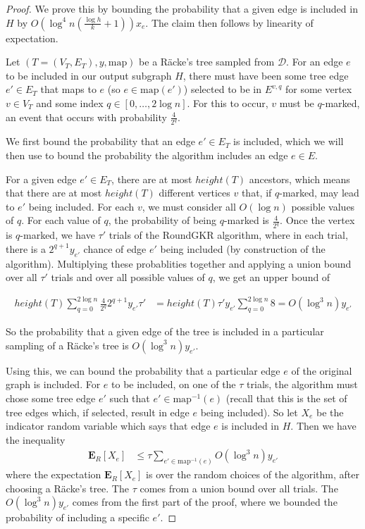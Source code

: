 \documentclass[12pt]{article}
\begin{document}
\begin{proof}
We prove this by bounding the probability that a given edge is included in $H$ by $O(\log^4n(\frac{\log h}{k} + 1))x_e$. The claim then follows by linearity of expectation.

Let $(T = (V_T, E_T), y, \text{map})$ be a R\"{a}cke's tree sampled from $\mathcal{D}$. For an edge $e$ to be included in our output subgraph $H$, there must have been some tree edge $e' \in E_T$ that maps to $e$ (so $e \in \mathrm{map}(e')$) selected to be in $E^{v,q}$ for some vertex $v \in V_T$ and some index $q \in [0,\dots,2\log n]$. For this to occur, $v$ must be $q$-marked, an event that occurs with probability $\frac{4}{2^{q}}$. 

We first bound the probability that an edge $e' \in E_T$ is included, which we will then use to bound the probability the algorithm includes an edge $e \in E$.

For a given edge $e' \in E_T$, there are at most $height(T)$ ancestors, which means that there are at most $height(T)$ different vertices $v$ that, if $q$-marked, may lead to $e'$ being included. For each $v$, we must consider all $O(\log n)$ possible values of $q$. For each value of $q$, the probability of being $q$-marked is $\frac{4}{2^{q}}$. Once the vertex is $q$-marked, we have $\tau'$ trials of the RoundGKR algorithm, where in each trial, there is a $2^{q+1}y_{e'}$ chance of edge $e'$ being included (by construction of the algorithm). Multiplying these probablities together and applying a union bound over all $\tau'$ trials and over all possible values of $q$, we get an upper bound of 

\begin{align}
height(T) \sum_{q=0}^{2\log n} \frac{4}{2^{q}} 2^{q+1} y_{e'} \tau' &= height(T) \tau' y_{e'} \sum_{q=0}^{2\log n} 8 = O(\log^3 n) y_{e'} 
\end{align}

So the probability that a given edge of the tree is included in a particular sampling of a R\"{a}cke's tree is $O(\log^3 n) y_{e'}$. 

Using this, we can bound the probability that a particular edge $e$ of the original graph is included. For $e$ to be included, on one of the $\tau$ trials, the algorithm must chose some tree edge $e'$ such that $e' \in \mathrm{map}^{-1}(e)$ (recall that this is the set of tree edges which, if selected, result in edge $e$ being included). So let $X_e$ be the indicator random variable which says that edge $e$ is included in $H$. Then we have the inequality
\begin{align}
 \textbf{E}_{R}[X_e] &\leq \tau \sum_{e' \in \mathrm{map}^{-1}(e)} O(\log^3 n) y_{e'} 
\end{align}
where the expectation $\textbf{E}_{R}[X_e]$ is over the random choices of the algorithm, after choosing a R\"{a}cke's tree. The $\tau$ comes from a union bound over all trials. The $O(\log^3 n)y_{e'}$ comes from the first part of the proof, where we bounded the probability of including a specific $e'$. 


\end{proof}
\end{document}
